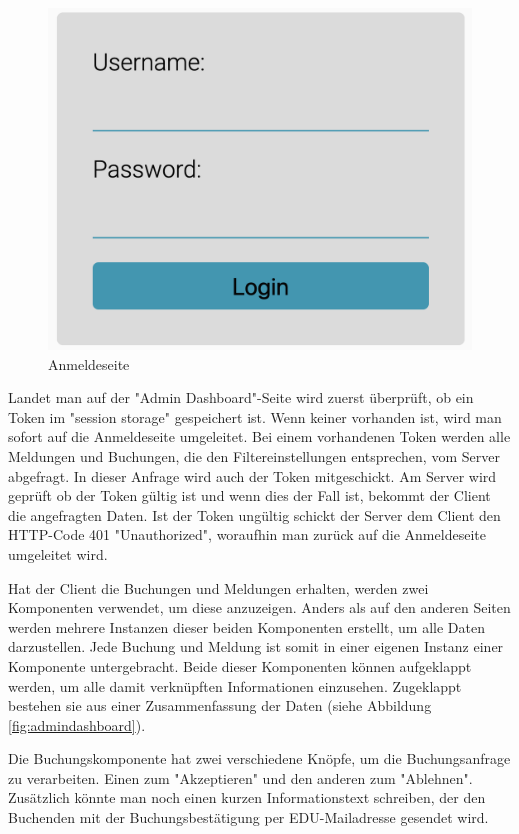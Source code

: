 \begin{figure}[H]
    \centering
    \includegraphics[width=120mm]{media/WebComponents/Login_light.png}
    \caption{Anmeldeseite}
\end{figure}

Landet man auf der "Admin Dashboard"-Seite wird zuerst überprüft, ob ein Token im "session storage" gespeichert ist. Wenn keiner vorhanden ist, wird man sofort auf die Anmeldeseite umgeleitet. Bei einem vorhandenen Token werden alle Meldungen und Buchungen, die den Filtereinstellungen entsprechen, vom Server abgefragt. In dieser Anfrage wird auch der Token mitgeschickt. Am Server wird geprüft ob der Token gültig ist und wenn dies der Fall ist, bekommt der Client die angefragten Daten. Ist der Token ungültig schickt der Server dem Client den HTTP-Code 401 "Unauthorized", woraufhin man zurück auf die Anmeldeseite umgeleitet wird.

Hat der Client die Buchungen und Meldungen erhalten, werden zwei Komponenten verwendet, um diese anzuzeigen. Anders als auf den anderen Seiten werden mehrere Instanzen dieser beiden Komponenten erstellt, um alle Daten darzustellen. Jede Buchung und Meldung ist somit in einer eigenen Instanz einer Komponente untergebracht. Beide dieser Komponenten können aufgeklappt werden, um alle damit verknüpften Informationen einzusehen. Zugeklappt bestehen sie aus einer Zusammenfassung der Daten (siehe Abbildung \ref{fig:admindashboard}).

Die Buchungskomponente hat zwei verschiedene Knöpfe, um die Buchungsanfrage zu verarbeiten. Einen zum "Akzeptieren" und den anderen zum "Ablehnen". Zusätzlich könnte man noch einen kurzen Informationstext schreiben, der den Buchenden mit der Buchungsbestätigung per EDU-Mailadresse gesendet wird. 

